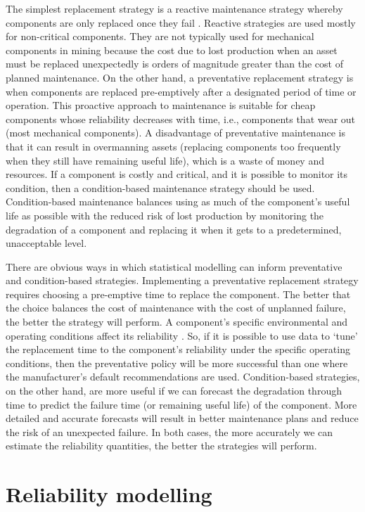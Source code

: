 The simplest replacement strategy is a reactive maintenance strategy whereby components are only replaced once they fail \citep{heng2009}. Reactive strategies are used mostly for non-critical components. They are not typically used for mechanical components in mining because the cost due to lost production when an asset must be replaced unexpectedly is orders of magnitude greater than the cost of planned maintenance. On the other hand, a preventative replacement strategy is when components are replaced pre-emptively after a designated period of time or operation. This proactive approach to maintenance is suitable for cheap components whose reliability decreases with time, i.e., components that wear out (most mechanical components). A disadvantage of preventative maintenance is that it can result in overmanning assets (replacing components too frequently when they still have remaining useful life), which is a waste of money and resources. If a component is costly and critical, and it is possible to monitor its condition, then a condition-based maintenance strategy should be used. Condition-based maintenance balances using as much of the component's useful life as possible with the reduced risk of lost production by monitoring the degradation of a component and replacing it when it gets to a predetermined, unacceptable level.

There are obvious ways in which statistical modelling can inform preventative and condition-based strategies. Implementing a preventative replacement strategy requires choosing a pre-emptive time to replace the component. The better that the choice balances the cost of maintenance with the cost of unplanned failure, the better the strategy will perform. A component's specific environmental and operating conditions affect its reliability \citep{Meeker2022}. So, if it is possible to use data to `tune' the replacement time to the component's reliability under the specific operating conditions, then the preventative policy will be more successful than one where the manufacturer's default recommendations are used. Condition-based strategies, on the other hand, are more useful if we can forecast the degradation through time to predict the failure time (or remaining useful life) of the component. More detailed and accurate forecasts will result in better maintenance plans and reduce the risk of an unexpected failure. In both cases, the more accurately we can estimate the reliability quantities, the better the strategies will perform.

\section{Reliability modelling}
\label{sec:reliability}

